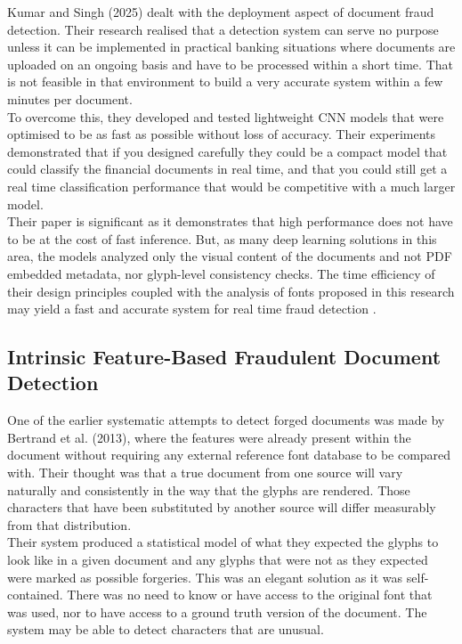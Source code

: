 \noindent Kumar and Singh (2025) dealt with the deployment aspect of document fraud detection. Their research realised that a detection system can serve no purpose unless it can be implemented in practical banking situations where documents are uploaded on an ongoing basis and have to be processed within a short time. That is not feasible in that environment to build a very accurate system within a few minutes per document.\\

\noindent To overcome this, they developed and tested lightweight CNN models that were optimised to be as fast as possible without loss of accuracy. Their experiments demonstrated that if you designed carefully they could be a compact model that could classify the financial documents in real time, and that you could still get a real time classification performance that would be competitive with a much larger model.\\

\noindent Their paper is significant as it demonstrates that high performance does not have to be at the cost of fast inference. But, as many deep learning solutions in this area, the models analyzed only the visual content of the documents and not PDF embedded metadata, nor glyph-level consistency checks. The time efficiency of their design principles coupled with the analysis of fonts proposed in this research may yield a fast and accurate system for real time fraud detection \cite{Kumar2025RealTimeFraud}.\\

\subsection{Intrinsic Feature-Based Fraudulent Document Detection}

\noindent One of the earlier systematic attempts to detect forged documents was made by Bertrand et al. (2013), where the features were already present within the document without requiring any external reference font database to be compared with. Their thought was that a true document from one source will vary naturally and consistently in the way that the glyphs are rendered. Those characters that have been substituted by another source will differ measurably from that distribution.\\

\noindent Their system produced a statistical model of what they expected the glyphs to look like in a given document and any glyphs that were not as they expected were marked as possible forgeries. This was an elegant solution as it was self-contained. There was no need to know or have access to the original font that was used, nor to have access to a ground truth version of the document. The system may be able to detect characters that are unusual.\\


